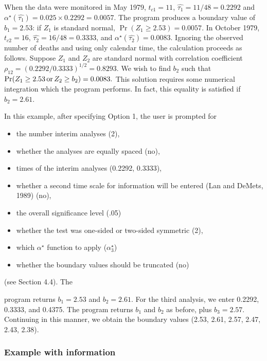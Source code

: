 When the data were monitored in May 1979, $t_{c1} = 11$,
$\hat{\tau_1}=11/48=0.2292$ and $\alpha^{\star}(\hat{\tau_1})=0.025 \times 0.2292
= 0.0057$.  The program produces a boundary value of $b_1 = 2.53$: if $Z_1$
is standard normal, $\Pr(Z_1 \geq 2.53) = 0.0057$.  In October 1979, $t_{c2}
= 16$, $\hat{\tau_2} = 16/48 = 0.3333$, and $\alpha^{\star}(\hat{\tau_2}) =
0.0083$.  Ignoring the observed number of deaths and using only calendar
time, the calculation proceeds as follows.  Suppose $Z_1$ and $Z_2$ are
standard normal with correlation coefficient
  \begin{math}
    \rho_{12}= (0.2292/0.3333)^{1/2}=0.8293.
  \end{math}
We wish to find $b_2$ such that
\begin{math}
  \Pr(Z_1 \geq 2.53 \, {\rm or} \, Z_2 \geq b_2) = 0.0083.
\end{math}
This solution requires some numerical integration which the program
performs.  In fact, this equality is satisfied if $b_2=2.61$.

{\singlespace
In this example, after specifying Option 1, the user is prompted for
  \begin{itemize}
    \item the number interim analyses (2),
    \item whether the analyses are equally spaced (no),
    \item times of the interim analyses (0.2292, 0.3333),
    \item whether a second time scale for information will be entered (Lan and
          DeMets, 1989) (no),
    \item the overall significance level (.05)
    \item whether the test was one-sided or two-sided symmetric (2),
    \item which $\alpha^{\star}$ function to apply
      ($\alpha^{\star}_3$)
    \item whether the boundary values should be truncated (no)
  \end{itemize}
(see Section 4.4).  The} program returns $b_1 = 2.53$ and $b_2 = 2.61$.
For the third analysis, we enter 0.2292, 0.3333, and 0.4375.  The program
returns $b_1$ and $b_2$ as before, plus $b_3 = 2.57$.  Continuing in this
manner, we obtain the boundary values (2.53, 2.61, 2.57, 2.47, 2.43, 2.38).


\subsubsection*{Example with information}

